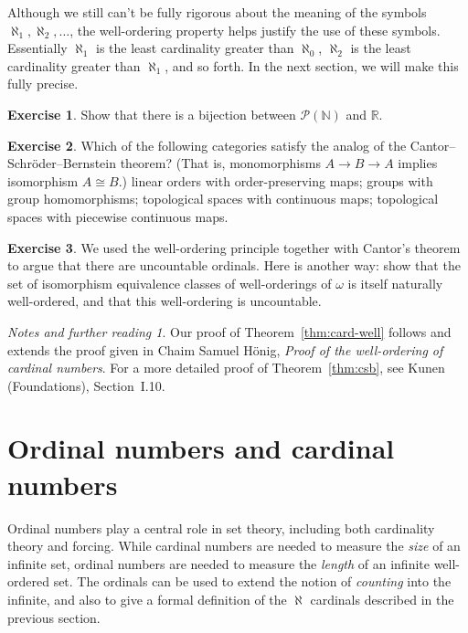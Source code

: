 \documentclass[11pt,oneside]{amsbook}
\newcommand{\NN}{\mathbb N}
\newcommand{\RR}{\mathbb R}
\theoremstyle{definition}
\newtheorem{exerc}{Exercise}[section]
\theoremstyle{plain}
\theoremstyle{definition}
\theoremstyle{remark}
\newtheorem*{notes}{Notes and further reading}
\numberwithin{equation}{section}
\numberwithin{figure}{section}
\begin{document}
Although we still can't be fully rigorous about the meaning of the symbols $\aleph_1,\aleph_2,\ldots$, the well-ordering property helps justify the use of these symbols. Essentially $\aleph_1$ is the least cardinality greater than $\aleph_0$, $\aleph_2$ is the least cardinality greater than $\aleph_1$, and so forth. In the next section, we will make this fully precise.

\begin{exerc}
  Show that there is a bijection between $\mathcal P(\NN)$ and $\RR$.
\end{exerc}

\begin{exerc}
  Which of the following categories satisfy the analog of the Cantor--Schr\"oder--Bernstein theorem? (That is, monomorphisms $A\to B\to A$ implies isomorphism $A\cong B$.) linear orders with order-preserving maps; groups with group homomorphisms; topological spaces with continuous maps; topological spaces with piecewise continuous maps.
\end{exerc}

\begin{exerc}
  We used the well-ordering principle together with Cantor's theorem to argue that there are uncountable ordinals. Here is another way: show that the set of isomorphism equivalence classes of well-orderings of $\omega$ is itself naturally well-ordered, and that this well-ordering is uncountable.
\end{exerc}

\begin{notes}
  Our proof of Theorem~\ref{thm:card-well} follows and extends the proof given in Chaim Samuel H\"onig, \emph{Proof of the well-ordering of cardinal numbers}. For a more detailed proof of Theorem~\ref{thm:csb}, see Kunen (Foundations), Section~I.10.
\end{notes}


\section{Ordinal numbers and cardinal numbers}

Ordinal numbers play a central role in set theory, including both cardinality theory and forcing. While cardinal numbers are needed to measure the \emph{size} of an infinite set, ordinal numbers are needed to measure the \emph{length} of an infinite well-ordered set. The ordinals can be used to extend the notion of \emph{counting} into the infinite, and also to give a formal definition of the $\aleph$ cardinals described in the previous section.
\end{document}
